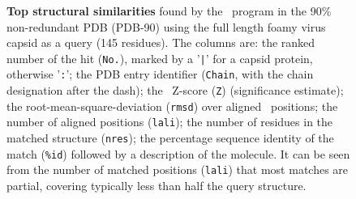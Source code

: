 \begin{figure}
\begin{singlespace}
\begin{tiny}
\begin{Verbatim}[frame=single]
\end{Verbatim}
\end{tiny}
\end{singlespace}
\begin{footnotesize}
\caption{
\label{Fig:dali}
{\bf Top structural similarities}
found by the \DALI\ program in the 90\% non-redundant PDB (PDB-90) using the full length foamy
virus capsid as a query (145 residues).
The columns are: the ranked number of the hit ({\tt No.}), marked by a '{\tt |}' for a capsid protein, otherwise '{\tt :}';
the PDB entry identifier ({\tt Chain}, with the chain designation after the dash); the \DALI\ Z-score ({\tt Z})
(significance estimate); the root-mean-square-deviation ({\tt rmsd}) over aligned \CA\ positions; the number
of aligned positions ({\tt lali}); the number of residues in the matched structure ({\tt nres}); the percentage
sequence identity of the match ({\tt \%id}) followed by a description of the molecule.
It can be seen from the number of matched positions ({\tt lali}) that most matches are partial, 
covering typically less than half the query structure.
}
\end{footnotesize}
\end{figure}

